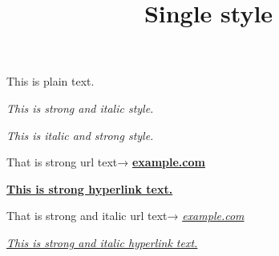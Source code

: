 \documentclass[a4paper,11pt,oneside,openany,report]{jsbook}
\title{Single style}
\begin{document}
\maketitle
This is plain text.

\textit{This is strong and italic style.}

\textit{This is italic and strong style.}

That is strong url text→
\href{example.com}{\textbf{example.com}}

\href{example.com}{\textbf{This is strong hyperlink text.}}

That is strong and italic url text→
\href{example.com}{\textit{example.com}}

\href{example.com}{\textit{This is strong and italic hyperlink text.}}
\end{document}
